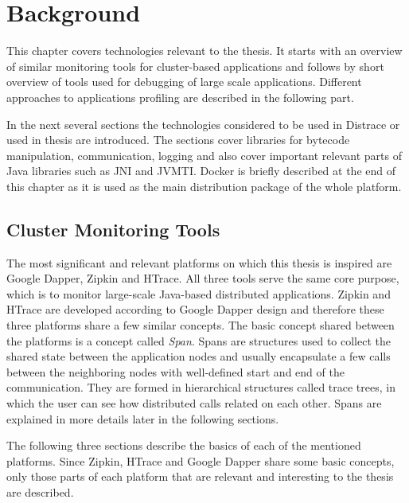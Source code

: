 \chapter{Background}
\label{chap:background}
This chapter covers technologies relevant to the thesis. It starts with an overview of similar monitoring tools for cluster-based applications and follows by short overview of tools used for debugging of large scale applications. Different approaches to applications profiling are described in the following part. 

In the next several sections the technologies considered to be used in Distrace or used in thesis are introduced. The sections cover libraries for bytecode manipulation, communication, logging and also cover important relevant parts of Java libraries such as JNI and JVMTI. Docker is briefly described at the end of this chapter as it is used as the main distribution package of the whole platform.

\section{Cluster Monitoring Tools}
The most significant and relevant platforms on which this thesis is inspired are Google Dapper, Zipkin and HTrace. All three tools serve the same core purpose, which is to monitor large-scale Java-based distributed applications. Zipkin and HTrace are developed according to Google Dapper design and therefore these three platforms share a few similar concepts. The basic concept shared between the platforms is a concept called \textit{Span}. Spans are structures used to collect the shared state between the application nodes and usually encapsulate a few calls between the neighboring nodes with well-defined start and end of the communication. They are formed in hierarchical structures called trace trees, in which the user can see how distributed calls related on each other. Spans are explained in more details later in the following sections. 

The following three sections describe the basics of each of the mentioned platforms. Since Zipkin, HTrace and Google Dapper share some basic concepts, only those parts of each platform that are relevant and interesting to the thesis are described.
